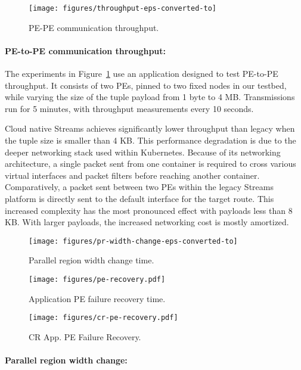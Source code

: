 \begin{figure}[t]
    \centering
    \texttt{[image: figures/throughput-eps-converted-to]}
    \caption{PE-PE communication throughput.}
    \label{fig:throughput}
\end{figure}

\paragraph{PE-to-PE communication throughput:} The experiments in
Figure~\ref{fig:throughput} use an application designed to test PE-to-PE
throughput. It consists of two PEs, pinned to two fixed nodes in our
testbed, while varying the size of the tuple payload from 1 byte to 4 MB.
Transmissions run for 5 minutes, with throughput measurements every 10 seconds.

Cloud native Streams achieves significantly lower throughput than legacy when
the tuple size is smaller than 4 KB. This performance degradation is due to the
deeper networking stack used within Kubernetes. Because of its networking
architecture, a single packet sent from one container is required to cross
various virtual interfaces and packet filters before reaching another container.
Comparatively, a packet sent between two PEs within the legacy Streams platform
is directly sent to the default interface for the target route. This increased
complexity has the most pronounced effect with payloads less than 8 KB.  With
larger payloads, the increased networking cost is mostly amortized.

\begin{figure}[t]
    \centering
    \texttt{[image: figures/pr-width-change-eps-converted-to]}
    \caption{Parallel region width change time.}
    \label{fig:pr-width-change}
\end{figure}

\begin{figure}[t]
    \centering
    \texttt{[image: figures/pe-recovery.pdf]}
    \caption{Application PE failure recovery time.}
    \label{fig:pe-recovery}
\end{figure}

\begin{figure}[t]
    \centering
    \texttt{[image: figures/cr-pe-recovery.pdf]}
    \caption{CR App. PE Failure Recovery.}
    \label{fig:cr-pe-recovery}
\end{figure}

\paragraph{Parallel region width change:}

